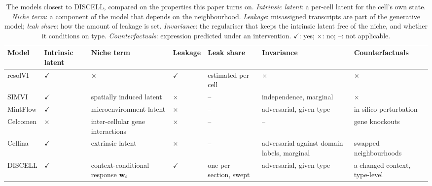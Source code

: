 \begin{table}[t]
\centering
\caption{ The models closest to DISCELL, compared on the properties this paper turns on. \emph{Intrinsic latent}: a per-cell latent for the cell's own state. \emph{Niche term}: a component of the model that depends on the neighbourhood. \emph{Leakage}: misassigned transcripts are part of the generative model; \emph{leak share}: how the amount of leakage is set. \emph{Invariance}: the regulariser that keeps the intrinsic latent free of the niche, and whether it conditions on type. \emph{Counterfactuals}: expression predicted under an intervention. $\checkmark$: yes; $\times$: no; --: not applicable.}
\label{tab:related}
\small
\setlength{\tabcolsep}{4pt}
\begin{tabular}{@{}>{\raggedright\arraybackslash}p{}>{\centering\arraybackslash}p{}>{\raggedright\arraybackslash}p{}>{\centering\arraybackslash}p{}>{\raggedright\arraybackslash}p{}>{\raggedright\arraybackslash}p{}>{\raggedright\arraybackslash}p{}@{}}
\toprule
Model & Intrinsic latent & Niche term & Leakage & Leak share & Invariance & Counterfactuals \\
\midrule
resolVI \citep{ergen2025} & $\checkmark$ & $\times$ & $\checkmark$ & estimated per cell & $\times$ & $\times$ \\
SIMVI \citep{dong2025simvi} & $\checkmark$ & spatially induced latent & $\times$ & -- & independence, marginal & $\times$ \\
MintFlow \citep{akbarnejad2025mintflow} & $\checkmark$ & microenvironment latent & $\times$ & -- & adversarial, given type & in silico perturbation \\
Celcomen \citep{megas2026celcomen} & $\times$ & inter-cellular gene interactions & $\times$ & -- & -- & gene knockouts \\
Cellina \citep{moeed2026cellina} & $\checkmark$ & extrinsic latent & $\times$ & -- & adversarial against domain labels, marginal & swapped neighbourhoods \\
DISCELL & $\checkmark$ & context-conditional response $\mathbf{w}_i$ & $\checkmark$ & one per section, swept & adversarial, given type & a changed context, type-level \\
\bottomrule
\end{tabular}
\end{table}

